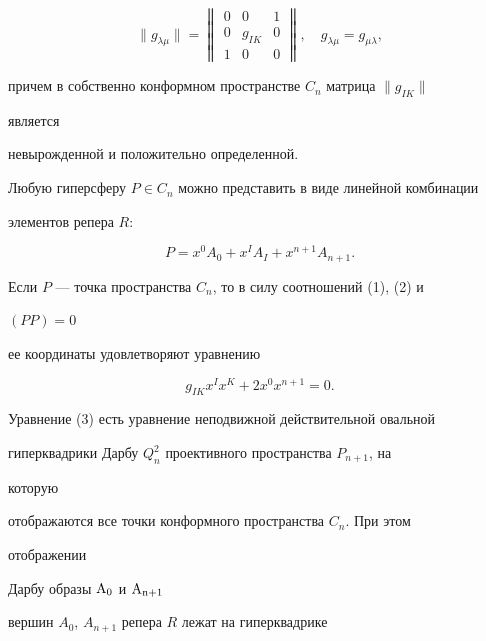 \begin{equation} 


\|g_{\lambda\mu}\|= 


\begin{Vmatrix} 


0 & 0 & 1 \\ 0 & g_{IK} & 0 \\ 1 & 0 & 0 


\end{Vmatrix} 


,\quad g_{\lambda\mu}=g_{\mu\lambda}, 


\end{equation} 


причем в собственно конформном пространстве $C_n$ матрица $\|g_{IK}\|$ 


является 


невырожденной и положительно определенной. 


 


Любую гиперсферу $P\in C_n$ можно представить в виде линейной комбинации 


элементов репера $R$: 


\begin{equation} 


P=x^0A_0+x^I A_I+x^{n+1}A_{n+1}. 


\end{equation} 


Если $P$ --- точка пространства $C_n$, то в силу соотношений (1), (2) и 


$(P{}P)=0$ 


ее координаты удовлетворяют уравнению 


\begin{equation} 


g_{IK}x^I x^K+2x^0x^{n+1}=0. 


\end{equation} 


Уравнение (3) есть уравнение неподвижной действительной овальной 


гиперквадрики Дарбу $Q^2_n$ проективного пространства $P_{n+1}$, на 


которую 


отображаются все точки конформного пространства $C_n$. При этом 


отображении 


Дарбу образы $\mathrm{A}_0$ и $\mathrm{A}_{\mathrm{n}+1}$


вершин $A_0$, $A_{n+1}$ репера $R$ лежат на гиперквадрике 


